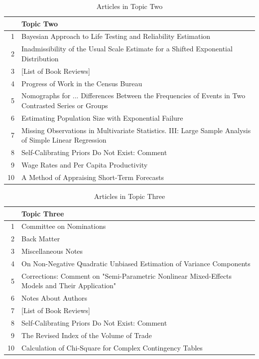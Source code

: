\documentclass{article}%
\theoremstyle{definition}
\begin{document}
\begin{table}[ht]
\centering
\caption{Articles in Topic Two}
\begin{tabular}{rl}
  \hline
 & Topic Two \\ 
  \hline
1 & Bayesian Approach to Life Testing and Reliability Estimation \\ 
  2 & Inadmissibility of the Usual Scale Estimate for a Shifted Exponential Distribution \\ 
  3 & [List of Book Reviews] \\ 
  4 & Progress of Work in the Census Bureau \\ 
  5 & Nomographs for ... Differences Between the Frequencies of Events in Two Contrasted Series or Groups \\ 
  6 & Estimating Population Size with Exponential Failure \\ 
  7 & Missing Observations in Multivariate Statistics. III: Large Sample Analysis of Simple Linear Regression \\ 
  8 & Self-Calibrating Priors Do Not Exist: Comment \\ 
  9 & Wage Rates and Per Capita Productivity \\ 
  10 & A Method of Appraising Short-Term Forecasts \\ 
   \hline
\end{tabular}
\end{table}


\begin{table}[ht]
\centering
\caption{Articles in Topic Three}
\begin{tabular}{rl}
  \hline
 & Topic Three \\ 
  \hline
1 & Committee on Nominations \\ 
  2 & Back Matter \\ 
  3 & Miscellaneous Notes \\ 
  4 & On Non-Negative Quadratic Unbiased Estimation of Variance Components \\ 
  5 & Corrections: Comment on "Semi-Parametric Nonlinear Mixed-Effects Models and Their Application" \\ 
  6 & Notes About Authors \\ 
  7 & [List of Book Reviews] \\ 
  8 & Self-Calibrating Priors Do Not Exist: Comment \\ 
  9 & The Revised Index of the Volume of Trade \\ 
  10 & Calculation of Chi-Square for Complex Contingency Tables \\ 
   \hline
\end{tabular}
\end{table}
\end{document}
